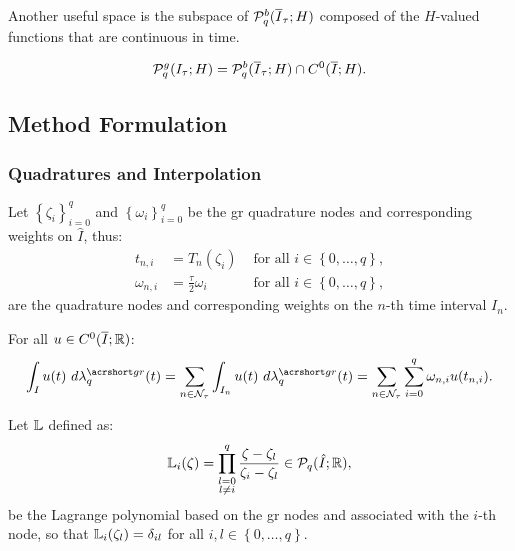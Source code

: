 Another useful space is the subspace of $\mathcal{P}_{q}^b(\overline{I}_{\tau}; H)$ composed of the $H$-valued functions that are continuous in time.

\begin{definition}
    \begin{align}
        \mathcal{P}_{q}^g(I_{\tau}; H) = \mathcal{P}_{q}^b(\overline{I}_{\tau}; H) \cap C^0(\overline{I}; H).
    \end{align}
\end{definition}

\newpage
\subsection{Method Formulation} \label{subsection:method_formulation}

\subsubsection{Quadratures and Interpolation}

Let $\left\{ \zeta_i \right\}_{i = 0}^{q}$ and $\left\{ \omega_i \right\}_{i = 0}^{q}$ be the \acrfull{gr} quadrature nodes and corresponding weights on $\hat{I}$, thus:
\begin{align}
    t_{n, i} &= T_n(\zeta_i) &\text{ for all } i \in \left\{ 0, \dots, q \right\}, \\
    \omega_{n, i} &= \frac{\tau}{2} \omega_i &\text{ for all } i \in \left\{ 0, \dots, q \right\},
\end{align}
are the quadrature nodes and corresponding weights on the $n$-th time interval $I_n$.

\begin{definition}[$\lambdaGR_q$]
    For all $u \in C^0(\overline{I}; \mathbb{R})$:
    \begin{align}
        \int_I u(t) ~ d \lambdaGR_q(t) = \sum_{n \in \TimeIndices} \int_{I_n} u(t) ~ d \lambdaGR_q(t) = \sum_{n \in \TimeIndices} \sum_{i = 0}^q \omega_{n, i} u(t_{n, i}).
    \end{align}
\end{definition}

\begin{definition}
    Let $\mathbb{L}$ defined as:
    \begin{align}
        \mathbb{L}_i (\zeta) = \prod_{\substack{l = 0 \\ l \neq i}}^q \frac{\zeta - \zeta_l}{\zeta_i - \zeta_l} \in \mathcal{P}_{q}(\hat{I}; \mathbb{R}),
    \end{align}
    be the Lagrange polynomial based on the \acrshort{gr} nodes and associated with the $i$-th node, so that $\mathbb{L}_i (\zeta_l) = \delta_{i l}$ for all $i, l \in \left\{ 0, \dots, q\right\}$.
\end{definition}

